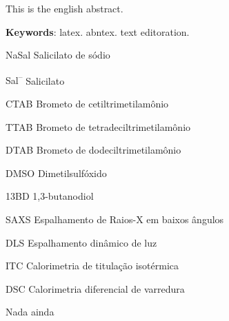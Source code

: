\documentclass[
	12pt,				%
	openright,			%
	twoside,			%
	a4paper,			%
	english,			%
	brazil%
	]{abntex2}
\newcommand{\Sal}{Sal\textsuperscript{--}}
\begin{document}
\begin{resumo}[Abstract]
 \begin{english}
   This is the english abstract.

   \vspace{\onelineskip}
 
   \noindent 
   \textbf{Keywords}: latex. abntex. text editoration.
 \end{english}
\end{resumo}




\listoffigures*
\cleardoublepage

\listoftables*
\listoflistings
\cleardoublepage

\begin{siglas}
  \item[NaSal] Salicilato de sódio
  \item[\Sal] Salicilato
  \item[CTAB] Brometo de cetiltrimetilamônio
  \item[TTAB] Brometo de tetradeciltrimetilamônio
  \item[DTAB] Brometo de dodeciltrimetilamônio
  \item[DMSO] Dimetilsulfóxido
  \item[13BD] 1,3-butanodiol
  \item[SAXS] Espalhamento de Raios-X em baixos ângulos
  \item[DLS] Espalhamento dinâmico de luz
  \item[ITC] Calorimetria de titulação isotérmica
  \item[DSC] Calorimetria diferencial de varredura
\end{siglas}

\begin{simbolos}
    \item  Nada ainda
\end{simbolos}

\tableofcontents*
\cleardoublepage

\end{document}
